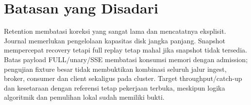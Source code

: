 \section{Batasan yang Disadari}
Retention membatasi koreksi yang sangat lama dan mencatatnya eksplisit. Journal memerlukan pengelolaan kapasitas disk jangka panjang. Snapshot mempercepat recovery tetapi full replay tetap mahal jika snapshot tidak tersedia. Batas payload FULL/unary/SSE membatasi konsumsi memori dengan admission; pengujian fixture besar tidak membuktikan kombinasi seluruh jalur ingest, broker, consumer dan client sekaligus pada cluster. Target throughput/catch-up dan kesetaraan dengan referensi tetap pekerjaan terbuka, meskipun logika algoritmik dan pemulihan lokal sudah memiliki bukti.
